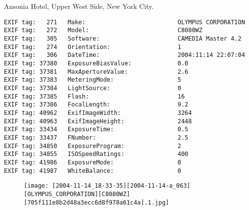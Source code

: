 \section{\protect{}}
\noindent Ansonia Hotel, Upper West Side, New York City.
\noindent
\begin{lstlisting}
EXIF tag:   271   Make:                          OLYMPUS CORPORATION
EXIF tag:   272   Model:                         C8080WZ
EXIF tag:   305   Software:                      CAMEDIA Master 4.2
EXIF tag:   274   Orientation:                   1
EXIF tag:   306   DateTime:                      2004:11:14 22:07:04
EXIF tag: 37380   ExposureBiasValue:             0.0
EXIF tag: 37381   MaxApertureValue:              2.6
EXIF tag: 37383   MeteringMode:                  5
EXIF tag: 37384   LightSource:                   0
EXIF tag: 37385   Flash:                         16
EXIF tag: 37386   FocalLength:                   9.2
EXIF tag: 40962   ExifImageWidth:                3264
EXIF tag: 40963   ExifImageHeight:               2448
EXIF tag: 33434   ExposureTime:                  0.5
EXIF tag: 33437   FNumber:                       2.5
EXIF tag: 34850   ExposureProgram:               2
EXIF tag: 34855   ISOSpeedRatings:               400
EXIF tag: 41986   ExposureMode:                  0
EXIF tag: 41987   WhiteBalance:                  0

\end{lstlisting}
\clearpage
\begin{figure}
\raggedleft
\texttt{[image: [2004-11-14\_18-33-35][2004-11-14-a\_063][OLYMPUS\_CORPORATION][C8080WZ][705f111e8b2d48a3ecc6d8f978a61c4a].1.jpg]}
\end{figure}


\clearpage
